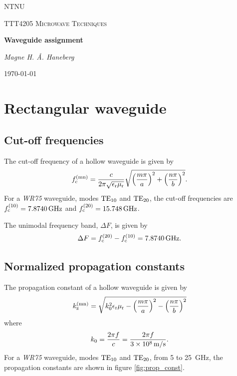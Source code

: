 \documentclass[12pt,a4paper, english, titlepage]{article}
\begin{document}
\begin{titlepage}
	\centering
	{\scshape\LARGE NTNU \par}
	\vspace{1cm}
	{\scshape\Large TTT4205 Microwave Techniques \par}
	\vspace{1.5cm}
	{\huge\bfseries Waveguide assignment \par}
	\vspace{2cm}
	{\Large\itshape Magne H. Å. Haneberg \par}
	\vfill
	{\large \today\par}
\end{titlepage}

\section{Rectangular waveguide}

\subsection{Cut-off frequencies}
The cut-off frequency of a hollow waveguide is given by
\begin{equation}
f_{\rm c}^{\rm (mn)} = \frac{c}{2 \pi \sqrt{\epsilon_{\rm r} \mu_{\rm r}}} \sqrt{\left(\frac{m \pi}{a}\right)^{\rm 2} + \left(\frac{n \pi}{b}\right)^{\rm 2}}.
\label{eq:cut-off-waveguide}
\end{equation}
For a \emph{WR75} waveguide, modes $\rm TE_{10}$ and $\rm TE_{20}$, the cut-off frequencies are $f_{\rm c}^{\rm (10)} = \SI{7.8740}{\giga\hertz}$ and $f_{\rm c}^{\rm (20)} = \SI{15.748}{\giga\hertz}$. \par
The unimodal frequency band, $\Delta F$, is given by
\begin{equation}
\Delta F = f_{\rm c}^{\rm (20)} - f_{\rm c}^{\rm (10)} = \SI{7.8740}{\giga\hertz}.
\end{equation}

\subsection{Normalized propagation constants}
The propagation constant of a hollow waveguide is given by
\begin{equation}
k_{\rm z}^{\rm (mn)} = \sqrt{k_{\rm 0}^{\rm 2} \epsilon_{\rm r} \mu_{\rm r} - \left(\frac{m \pi}{a}\right)^{\rm 2} - \left(\frac{n \pi}{b}\right)^{\rm 2}}
\end{equation}
where
\begin{equation}
k_{\rm 0} = \frac{2 \pi f}{c} = \frac{2 \pi f}{\SI{3e8}{\meter\slash\second}}.
\end{equation}
For a \emph{WR75} waveguide, modes $\rm TE_{10}$ and $\rm TE_{20}$, from \SI{5}{} to \SI{25}{\giga\hertz}, the propagation constants are shown in figure \ref{fig:prop_const}.
\end{document}
